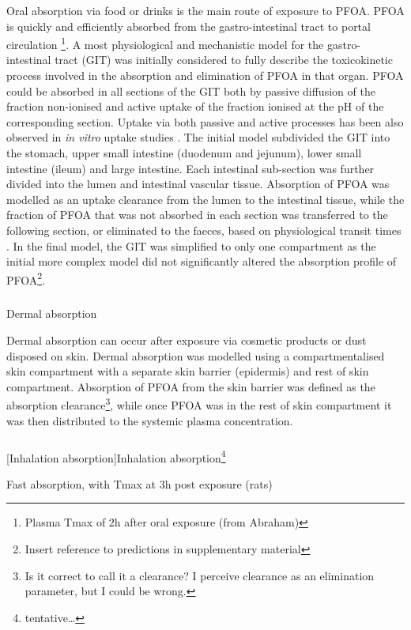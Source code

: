 \documentclass[
  authoryear,
  preprint]{elsarticle}
\makeatletter
\let\oldsubparagraph\subparagraph
\renewcommand{\subparagraph}{
    \@ifstar
      \xxxSubParagraphStar
      \xxxSubParagraphNoStar
  }
\newcommand{\xxxSubParagraphStar}[1]{\oldsubparagraph*{#1}\mbox{}}
\newcommand{\xxxSubParagraphNoStar}[1]{\oldsubparagraph{#1}\mbox{}}
\makeatother
\begin{document}
Oral absorption via food or drinks is the main route of exposure to
PFOA. PFOA is quickly and efficiently absorbed from the
gastro-intestinal tract to portal circulation
\citep{abraham2024}\footnote{Plasma Tmax of 2h after oral exposure (from
  Abraham)}. A most physiological and mechanistic model for the
gastro-intestinal tract (GIT) was initially considered to fully describe
the toxicokinetic process involved in the absorption and elimination of
PFOA in that organ. PFOA could be absorbed in all sections of the GIT
both by passive diffusion of the fraction non-ionised and active uptake
of the fraction ionised at the pH of the corresponding section. Uptake
via both passive and active processes has been also observed in \emph{in
vitro} uptake studies \citep{kimura2017, janssen2024} . The initial
model subdivided the GIT into the stomach, upper small intestine
(duodenum and jejunum), lower small intestine (ileum) and large
intestine. Each intestinal sub-section was further divided into the
lumen and intestinal vascular tissue. Absorption of PFOA was modelled as
an uptake clearance from the lumen to the intestinal tissue, while the
fraction of PFOA that was not absorbed in each section was transferred
to the following section, or eliminated to the faeces, based on
physiological transit times \citep{willmann2004}. In the final model,
the GIT was simplified to only one compartment as the initial more
complex model did not significantly altered the absorption profile of
PFOA\footnote{Insert reference to predictions in supplementary material}.

\subparagraph{Dermal absorption}\label{dermal-absorption}

Dermal absorption can occur after exposure via cosmetic products or dust
disposed on skin. Dermal absorption was modelled using a
compartmentalised skin compartment with a separate skin barrier
(epidermis) and rest of skin compartment. Absorption of PFOA from the
skin barrier was defined as the absorption clearance\footnote{Is it
  correct to call it a clearance? I perceive clearance as an elimination
  parameter, but I could be wrong.}, while once PFOA was in the rest of
skin compartment it was then distributed to the systemic plasma
concentration.

\subparagraph[Inhalation absorption]{\texorpdfstring{Inhalation
absorption\footnote{tentative\ldots{}}}{Inhalation absorption}}\label{inhalation-absorption5}

Fast absorption, with Tmax at 3h post exposure (rats)
\citep{gustafsson2022}
\end{document}
